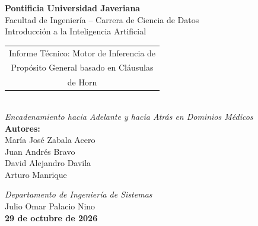 \documentclass[11pt,a4paper]{article}
\begin{document}
\centering

\vspace*{1.5cm}

{\LARGE \textbf{Pontificia Universidad Javeriana}}\\[0.4cm]
{\large Facultad de Ingeniería -- Carrera de Ciencia de Datos}\\[0.3cm]
{\normalsize Introducción a la Inteligencia Artificial}

\vspace{0.8cm}

\vfill 

{
    \huge \bfseries
    \begin{tabular}{c}
        Informe Técnico: Motor de Inferencia de \\
        Propósito General basado en Cláusulas \\ de Horn
    \end{tabular}
}\\[0.8cm]
{\large \textit{Encadenamiento hacia Adelante y hacia Atrás en Dominios Médicos}}\\[1cm]
\textbf{Autores:}\\
María José Zabala Acero\\
Juan Andrés Bravo\\
David Alejandro Davila\\
Arturo Manrique\\[0.4cm]


\vfill 


\textit{Departamento de Ingeniería de Sistemas}\\[0.8cm]
Julio Omar Palacio Nino\\[2cm]
\textbf{29 de octubre de 2026}


\newpage



\justifying
\begin{abstract}
Este documento presenta el diseño, modelado e implementación de un motor de inferencia simbólica basado en lógica proposicional y cláusulas de Horn para un dominio médico complejo. Se detallan las estrategias algorítmicas de encadenamiento hacia adelante (\textit{forward chaining}) y hacia atrás (\textit{backward chaining}), garantizando una profundidad lógica de al menos cuatro niveles. Asimismo, se valida el funcionamiento del sistema mediante casos clínicos experimentales, demostrando la trazabilidad paso a paso en la deducción de diagnósticos y estados de alerta.
\end{abstract}
\end{document}
